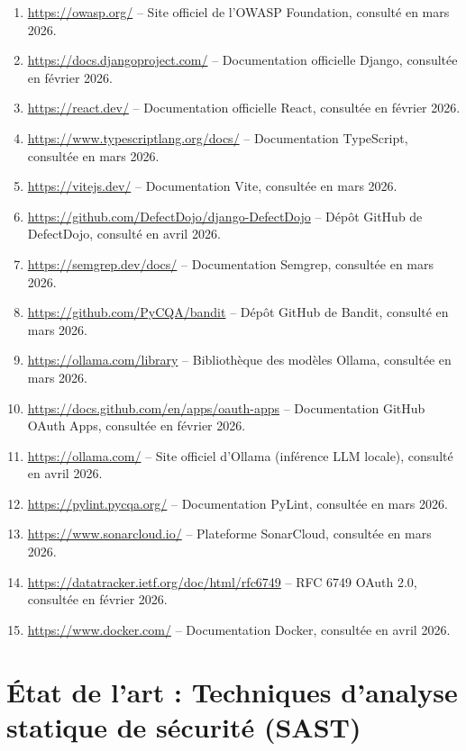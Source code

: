 \documentclass[12pt, a4paper, oneside]{report}
\begin{document}
\begin{enumerate}
    \item \url{https://owasp.org/} -- Site officiel de l'OWASP Foundation, consulté en mars 2026.
    \item \url{https://docs.djangoproject.com/} -- Documentation officielle Django, consultée en février 2026.
    \item \url{https://react.dev/} -- Documentation officielle React, consultée en février 2026.
    \item \url{https://www.typescriptlang.org/docs/} -- Documentation TypeScript, consultée en mars 2026.
    \item \url{https://vitejs.dev/} -- Documentation Vite, consultée en mars 2026.
    \item \url{https://github.com/DefectDojo/django-DefectDojo} -- Dépôt GitHub de DefectDojo, consulté en avril 2026.
    \item \url{https://semgrep.dev/docs/} -- Documentation Semgrep, consultée en mars 2026.
    \item \url{https://github.com/PyCQA/bandit} -- Dépôt GitHub de Bandit, consulté en mars 2026.
    \item \url{https://ollama.com/library} -- Bibliothèque des modèles Ollama, consultée en mars 2026.
    \item \url{https://docs.github.com/en/apps/oauth-apps} -- Documentation GitHub OAuth Apps, consultée en février 2026.
    \item \url{https://ollama.com/} -- Site officiel d'Ollama (inférence LLM locale), consulté en avril 2026.
    \item \url{https://pylint.pycqa.org/} -- Documentation PyLint, consultée en mars 2026.
    \item \url{https://www.sonarcloud.io/} -- Plateforme SonarCloud, consultée en mars 2026.
    \item \url{https://datatracker.ietf.org/doc/html/rfc6749} -- RFC 6749 OAuth 2.0, consultée en février 2026.
    \item \url{https://www.docker.com/} -- Documentation Docker, consultée en avril 2026.
\end{enumerate}

\appendix
\chapter{État de l'art : Techniques d'analyse statique de sécurité (SAST)}
\label{annexe:sast}
\end{document}
